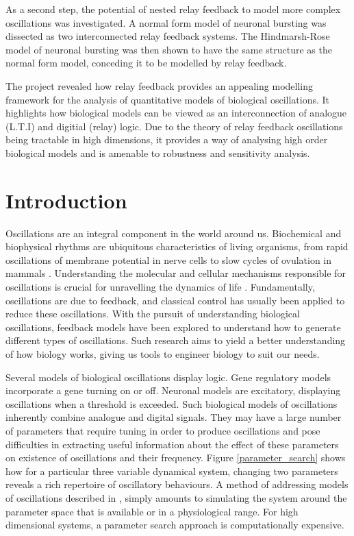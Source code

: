 \documentclass[a4paper, 12pt]{article}
\begin{document}
As a second step, the potential of nested relay feedback to model more complex oscillations was investigated. A normal form model of neuronal bursting was dissected as two interconnected relay feedback systems. The Hindmarsh-Rose model of neuronal bursting was then shown to have the same structure as the normal form model, conceding it to be modelled by relay feedback. 

The project revealed how relay feedback provides an appealing modelling framework for the analysis of quantitative models of biological oscillations. It highlights how biological models can be viewed as an interconnection of analogue (L.T.I) and digitial (relay) logic. Due to the theory of relay feedback oscillations being tractable in high dimensions, it provides a way of analysing high order biological models and is amenable to robustness and sensitivity analysis. 

\newpage
\tableofcontents
\newpage
\section{Introduction}
Oscillations are an integral component in the world around us. Biochemical and biophysical rhythms are ubiquitous characteristics of living organisms, from rapid oscillations of membrane potential in nerve cells to slow cycles of ovulation in mammals \cite{fall}. Understanding the molecular and cellular mechanisms responsible for oscillations is crucial for unravelling the dynamics of life \cite{goldbeter1}. Fundamentally, oscillations are due to feedback, and classical control has usually been applied to reduce these oscillations. With the pursuit of understanding biological oscillations, feedback models have been explored to understand how to generate different types of oscillations. Such research aims to yield a better understanding of how biology works, giving us tools to engineer biology to suit our needs. 

Several models of biological oscillations display logic. Gene regulatory models incorporate a gene turning on or off. Neuronal models are excitatory, displaying oscillations when a threshold is exceeded. Such biological models of oscillations inherently combine analogue and digital signals. They may have a large number of parameters that require tuning in order to produce oscillations and pose difficulties in extracting useful information about the effect of these parameters on existence of oscillations and their frequency. Figure \ref{parameter_search} shows how for a particular three variable dynamical system, changing two parameters reveals a rich repertoire of oscillatory behaviours. A method of addressing models of oscillations described in \cite{goldbeter1}, simply amounts to simulating the system around the parameter space that is available or in a physiological range. For high dimensional systems, a parameter search approach is computationally expensive. 
\end{document}
